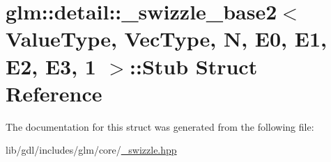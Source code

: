 \hypertarget{structglm_1_1detail_1_1__swizzle__base2_3_01_value_type_00_01_vec_type_00_01_n_00_01_e0_00_01_e1d74529ea3036199f62a3c164ac7e92d9}{}\section{glm\+:\+:detail\+:\+:\+\_\+swizzle\+\_\+base2$<$ Value\+Type, Vec\+Type, N, E0, E1, E2, E3, 1 $>$\+:\+:Stub Struct Reference}
\label{structglm_1_1detail_1_1__swizzle__base2_3_01_value_type_00_01_vec_type_00_01_n_00_01_e0_00_01_e1d74529ea3036199f62a3c164ac7e92d9}


The documentation for this struct was generated from the following file\+:\begin{DoxyCompactItemize}
\item 
lib/gdl/includes/glm/core/\hyperlink{__swizzle_8hpp}{\+\_\+swizzle.\+hpp}\end{DoxyCompactItemize}
